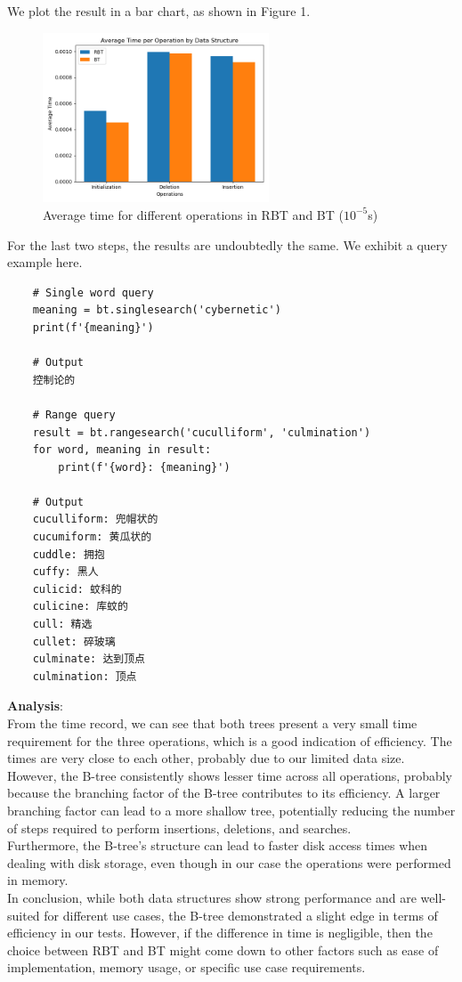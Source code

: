 \documentclass[UTF8]{ctexart}
\begin{document}
We plot the result in a bar chart, as shown in Figure 1.\\
\begin{figure}[h]
    \centering
    \includegraphics[width=0.6\textwidth]{Figure_1.png}
    \caption{Average time for different operations in RBT and BT ($10^{-5}$s)}
    \label{fig:times}
\end{figure}
\newpage
For the last two steps, the results are undoubtedly the same. We exhibit a query example here.\\
\begin{lstlisting}
    # Single word query
    meaning = bt.singlesearch('cybernetic')
    print(f'{meaning}')

    # Output
    控制论的

    # Range query
    result = bt.rangesearch('cuculliform', 'culmination')
    for word, meaning in result:
        print(f'{word}: {meaning}')

    # Output
    cuculliform: 兜帽状的
    cucumiform: 黄瓜状的
    cuddle: 拥抱
    cuffy: 黑人
    culicid: 蚊科的
    culicine: 库蚊的
    cull: 精选
    cullet: 碎玻璃
    culminate: 达到顶点
    culmination: 顶点
\end{lstlisting}

\textbf{Analysis}:\\
From the time record, we can see that both trees present a very small time requirement for the three operations, 
which is a good indication of efficiency. The times are very close to each other, probably due to our limited data size.\\
However, the B-tree consistently shows lesser time across all operations, probably because the branching factor of the B-tree contributes to its efficiency. 
A larger branching factor can lead to a more shallow tree, potentially reducing the number of steps required to perform insertions, deletions, and searches.\\
Furthermore, the B-tree's structure can lead to faster disk access times when dealing with disk storage, even though in our case the operations were performed in memory.\\
In conclusion, while both data structures show strong performance and are well-suited for different use cases, the B-tree demonstrated a slight edge in terms of efficiency in our tests.
However, if the difference in time is negligible, then the choice between RBT and BT might come down to other factors such as ease of implementation, memory usage, or specific use case requirements.\\
\end{document}
